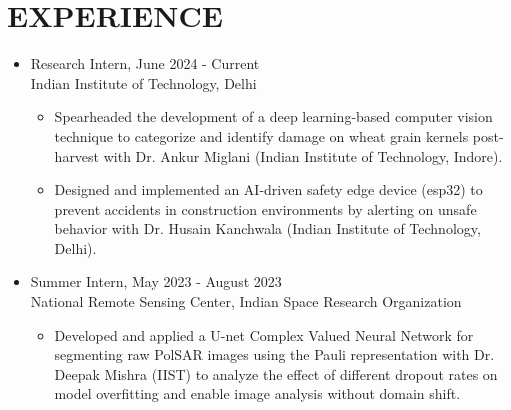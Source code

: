 \documentclass[11pt]{article}
\begin{document}
	\section*{\bf EXPERIENCE}
	\begin{itemize}[leftmargin=*,noitemsep,topsep=0pt]
		
		\item Research Intern, \hfill June 2024 - Current \\
		Indian Institute of Technology, Delhi
		\begin{itemize}[leftmargin=*,noitemsep,topsep=0pt]
			\item Spearheaded the development of a deep learning-based computer vision technique to categorize and identify damage on wheat grain kernels post-harvest with Dr. Ankur Miglani (Indian Institute of Technology, Indore).
			\item Designed and implemented an AI-driven safety edge device (esp32) to prevent accidents in construction environments by alerting on unsafe behavior with Dr. Husain Kanchwala (Indian Institute of Technology, Delhi).
		\end{itemize}
		
		
		\item Summer Intern, \hfill May 2023 - August 2023\\
		National Remote Sensing Center, Indian Space Research Organization
		
		\begin{itemize}[leftmargin=*,noitemsep,topsep=0pt]			
			\item Developed and applied a U-net Complex Valued Neural Network for segmenting raw PolSAR images using the Pauli representation with Dr. Deepak Mishra (IIST) to analyze the effect of different dropout rates on model overfitting and enable image analysis without domain shift. 
		\end{itemize}
		

\end{itemize}
\end{document}
